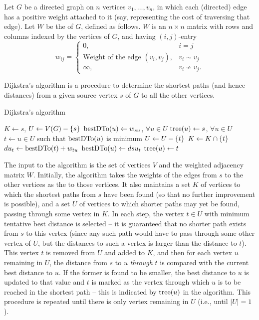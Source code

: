 Let $G$ be a directed graph on $n$ vertices $v_1, \ldots, v_n$, in which each (directed) edge has a positive weight attached to it (say, representing the cost of traversing that edge). Let $W$ be the  of $G$, defined as follows. $W$ is an $n \times n$ matrix with rows and columns indexed by the vertices of $G$, and having $(i,j)$-entry
\begin{equation*}
w_{ij} = \begin{cases}
0, & i = j\\
\text{Weight of the edge $(v_i, v_j)$}, & v_i \sim v_j\\
\infty, & v_i \not\sim v_j.
\end{cases}
\end{equation*}

Dijkstra's algorithm is a procedure to determine the shortest paths (and hence distances) from a given source vertex $s$ of $G$ to all the other vertices. 

\begin{algorithm}\caption{Dijkstra's algorithm}\label{alg:Dijkstra}
\begin{algorithmic}[1]
	\State $K \gets {s}$, $U \gets V(G) - \qty{s}$
	\State $\operatorname{bestDTo}(u) \gets w_{su}$, $\forall u \in U$
	\State $\operatorname{tree}(u) \gets s$, $\forall u \in U$
		\State $t \gets u \in U$ such that $\operatorname{bestDTo}(u)$ is minimum
		\State $U \gets U - \qty{t}$ 
		\State $K \gets K \cap \qty{t}$ 
			\State $du_t \gets \operatorname{bestDTo}(t) + w_{tu}$ 
				\State $\operatorname{bestDTo}(u) \gets dsu_t$
				\State $\operatorname{tree}(u) \gets t$
			\EndIf
		\EndFor
	\EndWhile
\end{algorithmic}
\end{algorithm}


The input to the algorithm is the set of vertices $V$ and the weighted adjacency matrix $W$. Initially, the algorithm takes the weights of the edges from $s$ to the other vertices as the  to those vertices. It also maintains a set $K$ of vertices to which the shortest paths from $s$ have been found (so that no further improvement is possible), and a set $U$ of vertices to which shorter paths may yet be found, passing through some vertex in $K$. In each step, the vertex $t \in U$ with minimum tentative best distance is selected -- it is guaranteed that no shorter path exists from $s$ to this vertex (since any such path would have to pass through some other vertex of $U$, but the distances to such a vertex is larger than the distance to $t$). This vertex $t$ is removed from $U$ and added to $K$, and then for each vertex $u$ remaining in $U$, the distance from $s$ to $u$ \emph{through} $t$ is compared with the current best distance to $u$. If the former is found to be smaller, the best distance to $u$ is updated to that value and $t$ is marked as the vertex through which $u$ is to be reached in the shortest path -- this is indicated by $\operatorname{tree}(u)$ in the algorithm. This procedure is repeated until there is only vertex remaining in $U$ (i.e., until $|U| = 1$).



